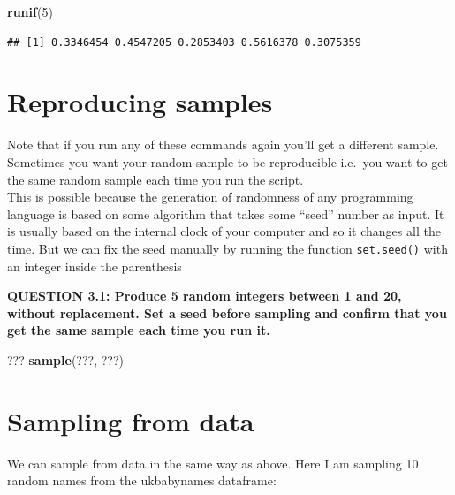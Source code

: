 \documentclass[]{book}
\newenvironment{Shaded}{\begin{snugshade}}{\end{snugshade}}
\newcommand{\DecValTok}[1]{\textcolor[rgb]{0.00,0.00,0.81}{#1}}
\newcommand{\KeywordTok}[1]{\textcolor[rgb]{0.13,0.29,0.53}{\textbf{#1}}}
\newcommand{\NormalTok}[1]{#1}
\newcommand{\OperatorTok}[1]{\textcolor[rgb]{0.81,0.36,0.00}{\textbf{#1}}}
\begin{document}
\begin{Shaded}
\begin{Highlighting}[]
\KeywordTok{runif}\NormalTok{(}\DecValTok{5}\NormalTok{)}
\end{Highlighting}
\end{Shaded}

\begin{verbatim}
## [1] 0.3346454 0.4547205 0.2853403 0.5616378 0.3075359
\end{verbatim}

\hypertarget{reproducing-samples}{%
\section{Reproducing samples}\label{reproducing-samples}}

Note that if you run any of these commands again you'll get a different sample. Sometimes you want your random sample to be reproducible i.e.~you want to get the same random sample each time you run the script.\\
This is possible because the generation of randomness of any programming language is based on some algorithm that takes some ``seed'' number as input. It is usually based on the internal clock of your computer and so it changes all the time. But we can fix the seed manually by running the function \texttt{set.seed()} with an integer inside the parenthesis

\textbf{QUESTION 3.1: Produce 5 random integers between 1 and 20, without replacement. Set a seed before sampling and confirm that you get the same sample each time you run it.}

\begin{Shaded}
\begin{Highlighting}[]
\NormalTok{???}
\KeywordTok{sample}\NormalTok{(???, ???)}
\end{Highlighting}
\end{Shaded}

\hypertarget{sampling-from-data-1}{%
\section{Sampling from data}\label{sampling-from-data-1}}

We can sample from data in the same way as above. Here I am sampling 10 random names from the ukbabynames dataframe:

\begin{Shaded}
\end{Shaded}
\end{document}
